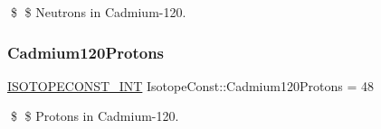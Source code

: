 \$ \$ Neutrons in Cadmium-\/120. \mbox{\label{group___isotope_const-_cadmium-_cd120_gae27074ba1a464c67476b37de93a5c246}} 
\subsubsection{\texorpdfstring{Cadmium120\+Protons}{Cadmium120Protons}}
{\footnotesize\ttfamily \mbox{\hyperlink{group___isotope_const-_macros_ga5f18360b3e99483a35c32d789e62621c}{I\+S\+O\+T\+O\+P\+E\+C\+O\+N\+S\+T\+\_\+\+I\+NT}} Isotope\+Const\+::\+Cadmium120\+Protons = 48}

\$ \$ Protons in Cadmium-\/120. 